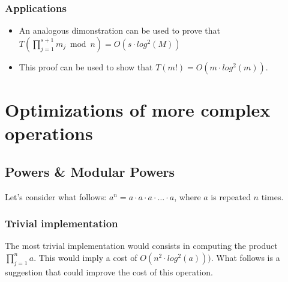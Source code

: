 \documentclass[12pt, a4paper, english]{report}
\begin{document}
\subsubsection{Applications}
\begin{itemize}
    \item An analogous dimonstration can be used to prove that $T(\prod_{j = 1}^{s+1} m_{j} \bmod n) = O(s \cdot log^{2}(M))$
    \item This proof can be used to show that $T(m!) = O(m \cdot log^{2}(m))$.
\end{itemize}

\section{Optimizations of more complex operations}
\subsection{Powers \& Modular Powers}
Let's consider what follows: $a^n = a \cdot a \cdot a \cdot \dots \cdot a$, where $a$ is repeated $n$ times.
\subsubsection{Trivial implementation}
The most trivial implementation would consists in computing the product $\prod_{j = 1}^{n} a$. This would imply a cost of $O(n^{2} \cdot log^{2}(a)))$.\newline
What follows is a suggestion that could improve the cost of this operation.
\end{document}
